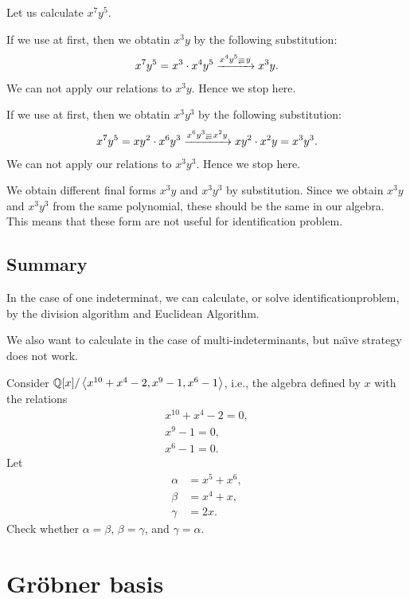 Let us calculate $x^7y^5$.

If we use  at first,
then we obtatin $x^3y$
by the following substitution:
\begin{align*}
  x^7y^5=x^3\cdot x^4y^5
  \xrightarrow{x^4y^5\Denotes y}
  x^3y.
\end{align*}
We can not apply our relations to $x^3y$.
Hence we stop here.

If we use  at first,
then we obtatin $x^3y^3$
by the following substitution:
\begin{align*}
  x^7y^5=xy^2\cdot x^6y^3
  \xrightarrow{x^6y^3\Denotes x^2y}
  xy^2\cdot x^2y=x^3y^3 .
\end{align*}
We can not apply our relations to $x^3y^3$.
Hence we stop here.

We obtain different final forms $x^3y$ and $x^3y^3$ by substitution.
Since  we obtain $x^3y$ and $x^3y^3$ from the same polynomial,
these should be the same in our algebra.
This means that these form are not useful for identification problem.

\section{Summary}
In the case of one indeterminat,
we can calculate, or solve identificationproblem,
by the division algorithm and Euclidean Algorithm.

We also want to calculate in the case of multi-indeterminants,
but na\"\i ve
strategy does not work.

\begin{quiz}
  Consider $\mathbb{Q}[x]/\Braket{x^{10}+x^4-2,x^9-1,x^6-1}$,
  i.e.,
  the algebra defined by $x$ with the relations
  \begin{align*}
    x^{10}+x^4-2=0,\\x^9-1=0,\\x^6-1=0.
  \end{align*}
  Let
  \begin{align*}
    \alpha &= x^5 + x^6,\\
    \beta &= x^4 + x,\\
    \gamma &= 2x.
  \end{align*}
  Check whether $\alpha=\beta$, $\beta=\gamma$,
  and $\gamma=\alpha$.
\end{quiz}


\chapter{Gr\"obner basis}
\label{chap:defgb}
